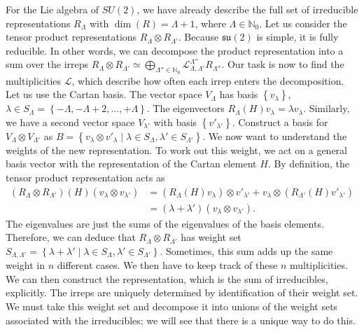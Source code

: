 For the Lie algebra of $SU(2)$, we have already describe the full set of irreducible representations $R_\Lambda$ with $\dim(R) = \Lambda + 1$, where $\Lambda \in \mathbb{N}_0$.
Let us consider the tensor product representations $R_{\Lambda} \otimes R_{\Lambda'}$. Because $\mathfrak{su}(2)$ is simple, it is fully reducible. In other words, we can decompose the product representation into a sum over the irreps $R_{\Lambda} \otimes R_{\Lambda'} \simeq \bigoplus_{\Lambda'' \in \mathbb{N}_0} \mathcal{L}_{\Lambda, \Lambda'}^{\Lambda''} R_{\Lambda''}$. Our task is now to find the multiplicities $\mathscr{L}$, which describe how often each irrep enters the decomposition.
Let us use the Cartan basis. The vector space $V_\Lambda$ has basis $\left\{ v_{\lambda} \right\}$, $\lambda \in S_\Lambda = \left\{ -\Lambda, -\Lambda +2, \dots, + \Lambda \right\}$.
The eigenvectors $R_\Lambda(H) v_{\lambda} = \lambda v_{\lambda}$. Similarly, we have a second vector space $V_{\lambda'}$ with basis $\left\{ v'_{\lambda'} \right\}$.
Construct a basis for $V_\Lambda \otimes V_{\Lambda'}$ as $B = \left\{ v_{\lambda} \otimes v'_{\lambda} \mid \lambda \in S_\Lambda, \lambda' \in S_{\Lambda'} \right\}$.
We now want to understand the weights of the new representation. To work out this weight, we act on a general basis vector with the representation of the Cartan element $H$. By definition, the tensor product representation acts as
\begin{align}
  (R_\Lambda \otimes R_{\Lambda'})(H) (v_{\lambda} \otimes v_{\lambda'}) &= (R_\Lambda (H) v_{\lambda}) \otimes v'_{\lambda'} + v_{\lambda} \otimes (R_{\Lambda'} (H) v'_{\lambda'}) \\
									 &= (\lambda + \lambda') (v_{\lambda} \otimes v_{\lambda'}).
\end{align}
The eigenvalues are just the sums of the eigenvalues of the basis elements. Therefore, we can deduce that $R_\Lambda \otimes R_{\Lambda'}$ has weight set $S_{\Lambda, \Lambda'} = \left\{ \lambda + \lambda' \mid \lambda \in S_{\Lambda}, \lambda' \in S_{\Lambda'} \right\}$. Sometimes, this sum adds up the same weight in $n$ different cases. We then have to keep track of these $n$ multiplicities.
We can then construct the representation, which is the sum of irreducibles, explicitly.
The irreps are uniquely determined by identification of their weight set.
We must take this weight set and decompose it into unions of the weight sets associated with the irreducibles; we will see that there is a unique way to do this.
